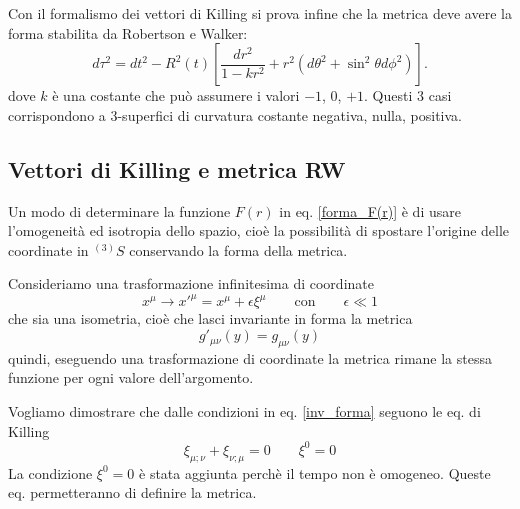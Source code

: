 Con il formalismo dei vettori di Killing si prova infine che la metrica deve
avere la forma stabilita da Robertson e Walker:
\begin{equation}
  d \tau^2 = dt^2 - R^2(t) \left[ \frac {dr^2}{1-kr^2} + r^2
    \left(d\theta^2+\sin^2 \theta d\phi^2\right) \right].
\end{equation}
dove $k$ è una costante che può assumere i valori $-1$, $0$, $+1$.  Questi 3
casi corrispondono a 3-superfici di curvatura costante negativa, nulla,
positiva.

\subsection{Vettori di Killing e metrica RW}

Un modo di determinare la funzione $F(r)$ in eq. \eqref{forma_F(r)} è di usare
l'omogeneità ed isotropia dello spazio, cioè la possibilità di spostare
l'origine delle coordinate in $^{(3)}S$ conservando la forma della metrica.

Consideriamo una trasformazione infinitesima di coordinate
\begin{equation}
  x^{\mu} \rightarrow x'^{\mu} = x^{\mu} + \epsilon \xi^{\mu}
  \qquad\text{con}\qquad \epsilon \ll 1
  \label{trasf_inf}
\end{equation}
che sia una isometria, cioè che lasci invariante in forma la metrica
\begin{equation}
  g'_{\mu \nu} (y) = g_{\mu \nu} (y)
  \label{inv_forma}
\end{equation}
quindi, eseguendo una trasformazione di coordinate la metrica rimane la stessa
funzione per ogni valore dell'argomento.

Vogliamo dimostrare che dalle condizioni in eq. \eqref{inv_forma} seguono le
eq. di Killing
\begin{equation}
  \xi_{\mu; \nu} + \xi_{\nu; \mu} = 0 \qquad\xi^0=0
  \label{eq_killing}
\end{equation}
La condizione $\xi^0=0$ è stata aggiunta perchè il tempo non è omogeneo.  Queste
eq. permetteranno di definire la metrica.

